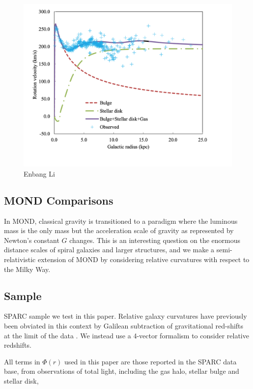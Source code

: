 \documentclass[reprint,%
 amsmath,amssymb,
 aps,
]{revtex4-1}
\begin{document}
\begin{figure}
    \centering
    \includegraphics{MW_Enbang_Li}
    \caption{Enbang Li \cite{Li2016ModellingMD}}
    \label{fig:my_label}
\end{figure}

\subsection{MOND Comparisons}


 In MOND,  classical gravity is transitioned to  a paradigm where the luminous mass is the only mass  but    the acceleration scale of gravity as represented by  Newton's  constant $G$ changes. This is an  interesting    question   on the enormous distance scales of spiral galaxies and larger structures, and we make a semi-relativistic extension of MOND 
 by considering relative curvatures with respect to the Milky Way. 
 \subsection{Sample}
 SPARC sample we test in this paper.   Relative galaxy curvatures have previously been   obviated in this context by Galilean subtraction of   gravitational red-shifts at the    limit of the data  \citep{MTW}. We instead use a 4-vector formalism to consider relative redshifts.  

 

 All terms in $\Phi(r)$ used in this paper  are   those reported in   the SPARC data base, from observations of total light, including the gas halo, stellar bulge and  stellar disk, 
 
\end{document}
